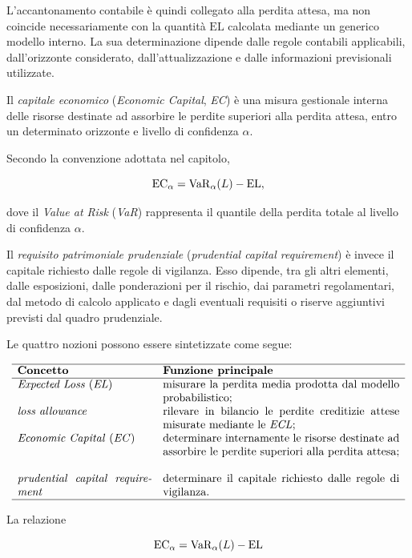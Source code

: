 L'accantonamento contabile \`{e} quindi collegato alla perdita attesa,
ma non coincide necessariamente con la quantit\`{a} $\mathrm{EL}$
calcolata mediante un generico modello interno. La sua determinazione
dipende dalle regole contabili applicabili, dall'orizzonte considerato,
dall'attualizzazione e dalle informazioni previsionali utilizzate.

Il \emph{capitale economico} (\emph{Economic Capital}, \emph{EC})
\`{e} una misura gestionale interna delle risorse destinate ad
assorbire le perdite superiori alla perdita attesa, entro un
determinato orizzonte e livello di confidenza $\alpha$.

Secondo la convenzione adottata nel capitolo,

\[
\mathrm{EC}_{\alpha}
=
\operatorname{VaR}_{\alpha}(L)
-
\mathrm{EL},
\]

dove il \emph{Value at Risk} (\emph{VaR}) rappresenta il quantile
della perdita totale al livello di confidenza $\alpha$.

Il \emph{requisito patrimoniale prudenziale}
(\emph{prudential capital requirement}) \`{e} invece il capitale
richiesto dalle regole di vigilanza. Esso dipende, tra gli altri
elementi, dalle esposizioni, dalle ponderazioni per il rischio, dai
parametri regolamentari, dal metodo di calcolo applicato e dagli
eventuali requisiti o riserve aggiuntivi previsti dal quadro
prudenziale.

Le quattro nozioni possono essere sintetizzate come segue:

\[
\begin{array}{p{4.2cm}p{7.4cm}}
\hline
\textbf{Concetto}
&
\textbf{Funzione principale}
\\
\hline
\emph{Expected Loss} (\emph{EL})
&
misurare la perdita media prodotta dal modello probabilistico;
\\
\emph{loss allowance}
&
rilevare in bilancio le perdite creditizie attese misurate mediante
le \emph{ECL};
\\
\emph{Economic Capital} (\emph{EC})
&
determinare internamente le risorse destinate ad assorbire le perdite
superiori alla perdita attesa;
\\
\emph{prudential capital requirement}
&
determinare il capitale richiesto dalle regole di vigilanza.
\\
\hline
\end{array}
\]

La relazione

\[
\mathrm{EC}_{\alpha}
=
\operatorname{VaR}_{\alpha}(L)
-
\mathrm{EL}
\]

